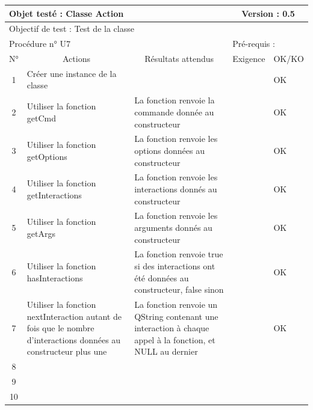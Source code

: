 \documentclass{../res/univ-projet}
\begin{document}
\begin{center}
	
    \begin{tabular}{|c|p{5cm}|p{5cm}|p{1.5cm}|p{1.5cm}|}
      \hline
      \multicolumn{3}{|l|}{Objet testé : Classe Action} & \multicolumn{2}{c|}{Version : 0.5}\\ \hline
      \multicolumn{5}{|l|}{Objectif de test : Test de la classe}\\ \hline
      \multicolumn{3}{|l|}{Procédure n° U7} & \multicolumn{2}{p{3cm}|}{Pré-requis : }\\ \hline
      \multicolumn{1}{|c|}{N°} & \multicolumn{1}{c|}{Actions} & \multicolumn{1}{c|}{Résultats attendus} & 
      \multicolumn{1}{c|}{Exigence} & \multicolumn{1}{c|}{OK/KO}\\ \hline
      1 & Créer une instance de la classe &  &  & OK \\
      2 & Utiliser la fonction getCmd & La fonction renvoie la commande donnée au constructeur &  & OK \\
      3 & Utiliser la fonction getOptions & La fonction renvoie les options données au constructeur &  & OK \\
      4 & Utiliser la fonction getInteractions & La fonction renvoie les interactions donnés au constructeur &  & OK \\
      5 & Utiliser la fonction getArgs & La fonction renvoie les arguments donnés au constructeur &  & OK \\
	    6 & Utiliser la fonction hasInteractions & La fonction renvoie true si des interactions ont été données au constructeur, false sinon &  & OK \\
      7 & Utiliser la fonction nextInteraction autant de fois que le nombre d'interactions données au constructeur plus une & La fonction renvoie un QString contenant une interaction à chaque appel à la fonction, et NULL au dernier &  & OK \\
      8 &  &  &  & \\
      9 &  &  &  & \\
      10 &  &  &  &\\ 
	\hline
    \end{tabular}
    \vskip 2.2cm
	

\end{center}
\end{document}
